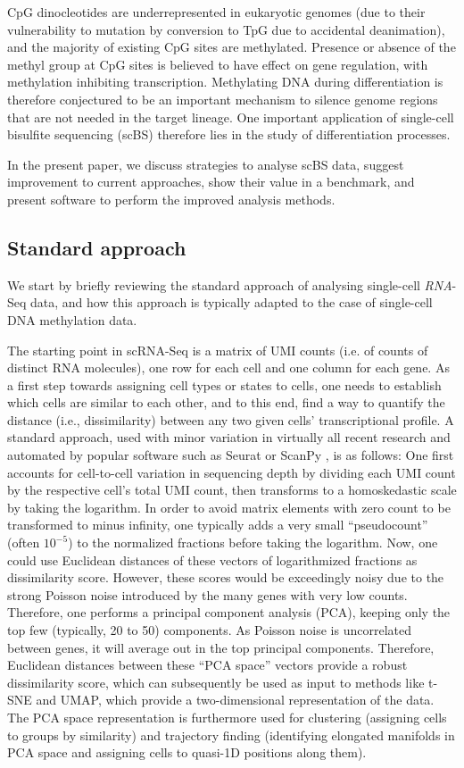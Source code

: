 \documentclass[twocolumn,10pt]{article}
\begin{document}
CpG dinocleotides are underrepresented in eukaryotic genomes (due to their vulnerability to mutation by conversion to TpG due to accidental deanimation), and the majority of existing CpG sites are methylated. Presence or absence of the methyl group at CpG sites is believed to have effect on gene regulation, with methylation inhibiting transcription. Methylating DNA during differentiation is therefore conjectured to be an important mechanism to silence genome regions that are not needed in the target lineage. One important application of single-cell bisulfite sequencing (scBS) therefore lies in the study of differentiation processes.

In the present paper, we discuss strategies to analyse scBS data, suggest improvement to current approaches, show their value in a benchmark, and present software to perform the improved analysis methods.

\subsection{Standard approach}

We start by briefly reviewing the standard approach of analysing single-cell \emph{RNA}-Seq data, and how this approach is typically adapted to the case of single-cell DNA methylation data.

The starting point in scRNA-Seq is a matrix of UMI counts (i.e. of counts of distinct RNA molecules), one row for each cell and one column for each gene. As a first step towards assigning cell types or states to cells, one needs to establish which cells are similar to each other, and to this end, find a way to quantify the distance (i.e., dissimilarity) between any two given cells' transcriptional profile. A standard approach, used with minor variation in virtually all recent research and automated by popular software such as Seurat \citep{Hao_2021} or ScanPy \citep{Wolf_2018}, is as follows: One first accounts for cell-to-cell variation in sequencing depth by dividing each UMI count by the respective cell's total UMI count, then transforms to a homoskedastic scale by taking the logarithm. In order to avoid matrix elements with zero count to be transformed to minus infinity, one typically adds a very small ``pseudocount'' (often $10^{-5}$) to the normalized fractions before taking the logarithm. Now, one could use Euclidean distances of these vectors  of logarithmized fractions as dissimilarity score. However, these scores would be exceedingly noisy due to the strong Poisson noise introduced by the many genes with very low counts. Therefore, one performs a principal component analysis (PCA), keeping only the top few (typically, 20 to 50) components. As Poisson noise is uncorrelated between genes, it will average out in the top principal components. Therefore, Euclidean distances between these ``PCA space'' vectors provide a robust dissimilarity score, which can subsequently be used as input to methods like t-SNE and UMAP, which provide a two-dimensional representation of the data. The PCA space representation is furthermore used for clustering (assigning cells to groups by similarity) and trajectory finding (identifying elongated manifolds in PCA space and assigning cells to quasi-1D positions along them).
\end{document}
